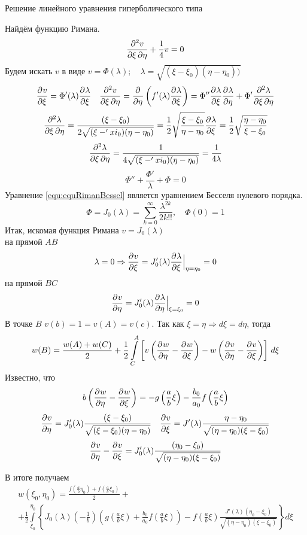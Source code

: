 \begin{example}{Решение линейного уравнения гиперболического типа}
	
Найдём функцию Римана.
\[
	\frac{\partial^2v}{\partial \xi\, \partial \eta} + \frac{1}{4} v = 0
\]
Будем искать $v$ в виде $v =\Phi(\lambda); \quad \lambda= \sqrt{(\xi - \xi_0)(\eta - \eta_0))}$\\
\begin{align*}
	&\frac{\partial^{}v}{\partial \xi^{}} =\Phi'(\lambda) \frac{\partial^{}\lambda}{\partial \xi^{}}  &\frac{\partial^2v}{\partial \xi\, \partial \eta} = \frac{\partial^{}}{\partial \eta^{}} \left(f'(\lambda) \frac{\partial^{}\lambda}{\partial \xi^{}}\right) =\Phi'' \frac{\partial^{}\lambda}{\partial \xi^{}} \frac{\partial^{}\lambda}{\partial \eta^{}}  +\Phi' \frac{\partial^2\lambda}{\partial \xi\, \partial \eta}
\end{align*}
\[
	\frac{\partial^2\lambda}{\partial \xi\, \partial \eta} = \frac{(\xi - \xi_0)}{2 \sqrt{(\xi - 'xi_0)(\eta - \eta_0)}} = \frac{1}{2} \sqrt{\frac{\xi - \xi_0}{\eta -\eta_0}} \frac{\partial^{}\lambda}{\partial \xi^{}} = \frac{1}{2} \sqrt{\frac{\eta - \eta_0}{\xi - \xi_0}}
\]
\[
	\frac{\partial^2\lambda}{\partial \xi\, \partial \eta} = \frac{1}{4 \sqrt{(\xi - 'xi_0)(\eta - \eta_0)}} = \frac{1}{4 \lambda}
\]
\begin{equation}
	\Phi'' + \frac{\Phi'}{\lambda} + \Phi = 0
	\label{equ:equRimanBessel}
\end{equation}
Уравнение \eqref{equ:equRimanBessel} является уравнением Бесселя нулевого порядка.
\[
	\Phi = J_0(\lambda) = \sum\limits_{k = 0}^{\infty} \frac{\lambda^{2k}}{2 k!!}, \quad \Phi(0) = 1
\] 
Итак, искомая функция Римана $v = J_0 (\lambda)$\\
на прямой $AB$
\[
	\lambda = 0 \Rightarrow \frac{\partial^{}v}{\partial \xi^{}} = J_0'(\lambda) \frac{\partial^{}\lambda}{\partial \xi^{}} \Big|_{\eta=\eta_0} = 0
\]
на прямой $BC$ 
\[
	\frac{\partial^{}v}{\partial \eta^{}} = J_0'(\lambda) \frac{\partial^{}\lambda}{\partial \eta^{}}\Big|_{\xi = \xi_0} = 0
\]
В точке $B$ $v(b) = 1 = v(A) = v(c)$. Так как $\xi = \eta \Rightarrow d\xi = d\eta$, тогда 
\[
	w(B) = \frac{w(A) + w(C)}{2} + \frac{1}{2} \int\limits_C^A \left[ v \left(\frac{\partial^{}w}{\partial \eta^{}} - \frac{\partial^{}w}{\partial \xi^{}} \right) - w \left(\frac{\partial^{}v}{\partial \eta^{}} - \frac{\partial^{}v}{\partial \xi^{}}\right)\right]\, d\xi
\]
Известно, что 
\[
	b\left(\frac{\partial^{}w}{\partial \eta^{}} - \frac{\partial^{}w}{\partial \xi^{}} \right) = - g\left(\frac{a}{b}\xi\right) - \frac{b_0}{a_0} f\left(\frac{a}{b} \xi\right)
\]
\begin{align*}
	&\frac{\partial^{}v}{\partial \eta^{}} = J_0'(\lambda) \frac{(\xi - \xi_0)}{\sqrt{(\xi - \xi_0)(\eta - \eta_0)}} & \frac{\partial^{}v}{\partial \xi^{}} = J'(\lambda) \frac{\eta - \eta_0}{\sqrt{(\eta - \eta_0)(\xi - \xi_0)}}
\end{align*}
\[
	\frac{\partial^{}v}{\partial \eta^{}} - \frac{\partial^{}v}{\partial \xi^{}} = J_0'(\lambda) \frac{(\eta_0 - \xi_0)}{\sqrt{(\eta - \eta_0) (\xi - \xi_0)}}
\]

В итоге получаем
\begin{multline}
	w (\xi_0, \eta_0) = \frac{f\left(\frac{a}{b} \eta_0 \right) + f\left(\frac{a}{b} \xi_0 \right)}{2} +{}\\
	+\frac{1}{2} \int\limits_{\xi_0}^{\eta_0} \left\{J_0(\lambda) \left(- \frac{1}{b}  \right) \left(g\left(\frac{a}{b}\xi\right) + \frac{b_0}{a_0} f\left(\frac{a}{b} \xi\right) \right) - f \left(\frac{a}{b} \xi \right) \frac{J'(\lambda)(\eta_0 - \xi_0)}{\sqrt{(\eta - \eta_0)(\xi - \xi_0)}} \right\} d\xi
\end{multline}


\end{example}
